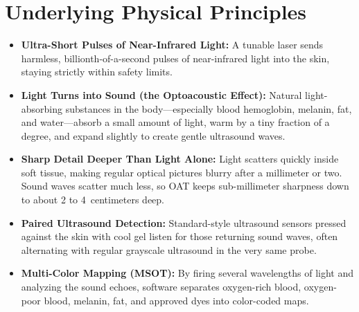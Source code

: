 \section{Underlying Physical Principles}
\begin{itemize}
  \item \textbf{Ultra-Short Pulses of Near-Infrared Light:} A tunable laser sends harmless, billionth-of-a-second pulses of near-infrared light into the skin, staying strictly within safety limits.
  \item \textbf{Light Turns into Sound (the Optoacoustic Effect):} Natural light-absorbing substances in the body---especially blood hemoglobin, melanin, fat, and water---absorb a small amount of light, warm by a tiny fraction of a degree, and expand slightly to create gentle ultrasound waves.
  \item \textbf{Sharp Detail Deeper Than Light Alone:} Light scatters quickly inside soft tissue, making regular optical pictures blurry after a millimeter or two. Sound waves scatter much less, so OAT keeps sub-millimeter sharpness down to about 2 to 4~centimeters deep.
  \item \textbf{Paired Ultrasound Detection:} Standard-style ultrasound sensors pressed against the skin with cool gel listen for those returning sound waves, often alternating with regular grayscale ultrasound in the very same probe.
  \item \textbf{Multi-Color Mapping (MSOT):} By firing several wavelengths of light and analyzing the sound echoes, software separates oxygen-rich blood, oxygen-poor blood, melanin, fat, and approved dyes into color-coded maps.
\end{itemize}


